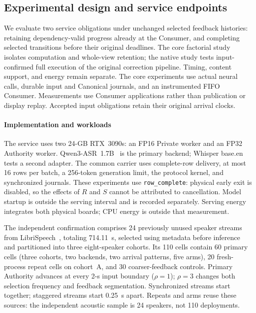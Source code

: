 \subsection{Experimental design and service endpoints}
We evaluate two service obligations under unchanged selected feedback
histories: retaining dependency-valid progress already at the Consumer,
and completing selected transitions before their original deadlines.
The core factorial study isolates computation and whole-view retention;
the native study tests input-confirmed full execution of the original
correction pipeline. Timing, content support, and energy remain separate.
The core experiments use actual neural
calls, durable input and Canonical journals, and an instrumented FIFO
Consumer. Measurements use Consumer applications rather than publication
or display replay. Accepted input obligations retain
their original arrival clocks.

\paragraph{Implementation and workloads}
The service uses two 24-GB RTX~3090s: an FP16 Private worker and an FP32
Authority worker. Qwen3-ASR~1.7B~\cite{shi2026qwen3asr} is the primary backend; Whisper base.en~\cite{radford2023whisper}
tests a second adapter. The common carrier uses complete-row delivery,
at most 16 rows per batch, a 256-token generation limit, the protocol
kernel, and synchronized journals. These experiments use
\texttt{row\_complete}: physical early exit is disabled, so the effects of
$R$ and $S$ cannot be attributed to cancellation. Model startup is outside
the serving interval and is recorded separately. Serving energy integrates
both physical boards; CPU energy is outside that measurement.

The independent confirmation comprises 24 previously unused speaker
streams from LibriSpeech~\cite{panayotov2015librispeech}, totaling
714.11~s, selected using metadata before inference and partitioned into
three eight-speaker cohorts. Its 110 cells contain 60 primary cells
(three cohorts, two backends, two arrival patterns, five arms), 20
fresh-process repeat cells on cohort~A, and 30 coarser-feedback controls.
Primary Authority advances at every 2-s input boundary ($\rho=1$);
$\rho=3$ changes both selection frequency and feedback segmentation.
Synchronized streams start together; staggered streams start 0.25~s
apart. Repeats and arms reuse these sources: the independent acoustic
sample is 24 speakers, not 110 deployments.


